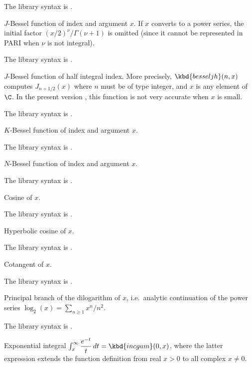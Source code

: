 The library syntax is .

\label{se:besselj}
$J$-Bessel function of index  and
argument $x$. If $x$ converts to a power series, the initial factor
$(x/2)^\nu/\Gamma(\nu+1)$ is omitted (since it cannot be represented in PARI
when $\nu$ is not integral).

The library syntax is .

\label{se:besseljh}
$J$-Bessel function of half integral index.
More precisely, $\kbd{besseljh}(n,x)$ computes $J_{n+1/2}(x)$ where $n$
must be of type integer, and $x$ is any element of $\C$. In the
present version \vers, this function is not very accurate when $x$ is small.

The library syntax is .

\label{se:besselk}
$K$-Bessel function of index  and argument $x$.

The library syntax is .

\label{se:besseln}
$N$-Bessel function of index  and argument $x$.

The library syntax is .

\label{se:cos}
Cosine of $x$.

The library syntax is .

\label{se:cosh}
Hyperbolic cosine of $x$.

The library syntax is .

\label{se:cotan}
Cotangent of $x$.

The library syntax is .

\label{se:dilog}
Principal branch of the dilogarithm of $x$,
i.e.~analytic continuation of the power series $\log_2(x)=\sum_{n\ge1}x^n/n^2$.

The library syntax is .

\label{se:eint1}
Exponential integral $\int_x^\infty \dfrac{e^{-t}}{t}\,dt =
\kbd{incgam}(0, x)$, where the latter expression extends the function
definition from real $x > 0$ to all complex $x \neq 0$.

